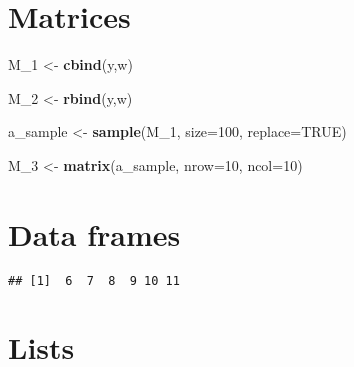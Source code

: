 \documentclass[]{article}
\newenvironment{Shaded}{\begin{snugshade}}{\end{snugshade}}
\newcommand{\KeywordTok}[1]{\textcolor[rgb]{0.13,0.29,0.53}{\textbf{#1}}}
\newcommand{\DataTypeTok}[1]{\textcolor[rgb]{0.13,0.29,0.53}{#1}}
\newcommand{\DecValTok}[1]{\textcolor[rgb]{0.00,0.00,0.81}{#1}}
\newcommand{\StringTok}[1]{\textcolor[rgb]{0.31,0.60,0.02}{#1}}
\newcommand{\OtherTok}[1]{\textcolor[rgb]{0.56,0.35,0.01}{#1}}
\newcommand{\OperatorTok}[1]{\textcolor[rgb]{0.81,0.36,0.00}{\textbf{#1}}}
\newcommand{\NormalTok}[1]{#1}
\begin{document}
\section{Matrices}\label{matrices}

\begin{Shaded}
\begin{Highlighting}[]
\NormalTok{M_}\DecValTok{1}\NormalTok{ <-}\StringTok{ }\KeywordTok{cbind}\NormalTok{(y,w)}

\NormalTok{M_}\DecValTok{2}\NormalTok{ <-}\StringTok{ }\KeywordTok{rbind}\NormalTok{(y,w)}

\NormalTok{a_sample <-}\StringTok{ }\KeywordTok{sample}\NormalTok{(M_}\DecValTok{1}\NormalTok{, }\DataTypeTok{size=}\DecValTok{100}\NormalTok{, }\DataTypeTok{replace=}\OtherTok{TRUE}\NormalTok{)}

\NormalTok{M_}\DecValTok{3}\NormalTok{ <-}\StringTok{ }\KeywordTok{matrix}\NormalTok{(a_sample, }\DataTypeTok{nrow=}\DecValTok{10}\NormalTok{, }\DataTypeTok{ncol=}\DecValTok{10}\NormalTok{)}
\end{Highlighting}
\end{Shaded}

\section{Data frames}\label{data-frames}

\begin{Shaded}
\end{Shaded}

\begin{verbatim}
## [1]  6  7  8  9 10 11
\end{verbatim}

\section{Lists}\label{lists}

\begin{Shaded}
\end{Shaded}
\end{document}
